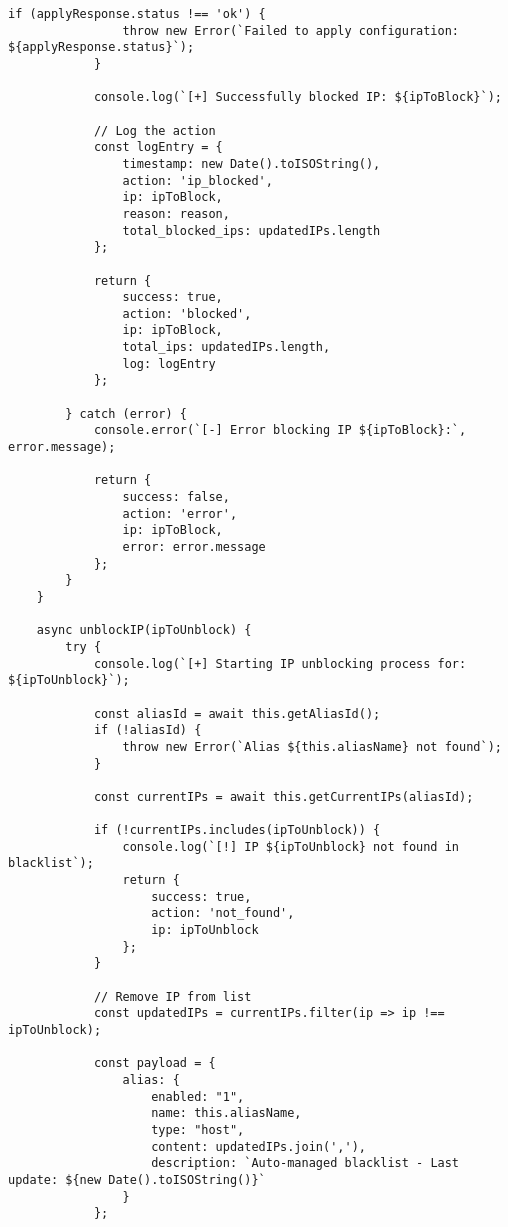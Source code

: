 \begin{lstlisting}[style=jsstyle,caption=Script n8n pour blocage automatique IP OPNsense]
            if (applyResponse.status !== 'ok') {
                throw new Error(`Failed to apply configuration: ${applyResponse.status}`);
            }

            console.log(`[+] Successfully blocked IP: ${ipToBlock}`);
            
            // Log the action
            const logEntry = {
                timestamp: new Date().toISOString(),
                action: 'ip_blocked',
                ip: ipToBlock,
                reason: reason,
                total_blocked_ips: updatedIPs.length
            };

            return {
                success: true,
                action: 'blocked',
                ip: ipToBlock,
                total_ips: updatedIPs.length,
                log: logEntry
            };

        } catch (error) {
            console.error(`[-] Error blocking IP ${ipToBlock}:`, error.message);
            
            return {
                success: false,
                action: 'error',
                ip: ipToBlock,
                error: error.message
            };
        }
    }

    async unblockIP(ipToUnblock) {
        try {
            console.log(`[+] Starting IP unblocking process for: ${ipToUnblock}`);
            
            const aliasId = await this.getAliasId();
            if (!aliasId) {
                throw new Error(`Alias ${this.aliasName} not found`);
            }

            const currentIPs = await this.getCurrentIPs(aliasId);
            
            if (!currentIPs.includes(ipToUnblock)) {
                console.log(`[!] IP ${ipToUnblock} not found in blacklist`);
                return {
                    success: true,
                    action: 'not_found',
                    ip: ipToUnblock
                };
            }

            // Remove IP from list
            const updatedIPs = currentIPs.filter(ip => ip !== ipToUnblock);
            
            const payload = {
                alias: {
                    enabled: "1",
                    name: this.aliasName,
                    type: "host",
                    content: updatedIPs.join(','),
                    description: `Auto-managed blacklist - Last update: ${new Date().toISOString()}`
                }
            };


\end{lstlisting}
